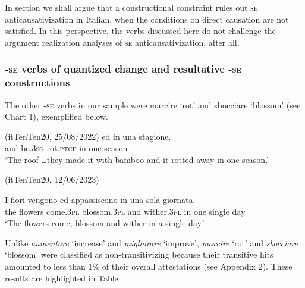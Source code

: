 \documentclass[output=paper,colorlinks,citecolor=brown
]{langscibook}
\begin{document}
In section  we shall argue that a constructional constraint rules out \textsc{se} anticausativization in Italian, when the conditions on direct causation are not satisfied. In this perspective, the verbs discussed here do not challenge the argument realization analyses of \textsc{se} anticausativization, after all.

\subsubsection{-\textsc{se} verbs of quantized change and resultative -\textsc{se} constructions}
\label{bentley_section_3.3.2}

The other -\textsc{se} verbs in our sample were marcire ‘rot’ and sbocciare ‘blossom’ (see Chart 1), exemplified below.

\hspace*{\fill}(itTenTen20, 25/08/2022)\quad
\ea \label{bentley_example_14}
    ed		 						in	una	stagione.  \\
 {} 				and	be.3\textsc{sg}	rot.\textsc{ptcp}		in	one	season \\
    \glt 			‘The roof  \ldots  they made it with bamboo and it rotted away in one season.’
\z



\hspace*{\fill}(itTenTen20, 12/06/2023)\quad

\ea \label{bentley_example_15}
    \gll I			fiori				vengono						ed		appassiscono	in 	una sola			giornata. \\
 the	flowers	come.3\textsc{pl}		blossom.3\textsc{pl}	and	wither.3\textsc{pl}				in		one	single	day \\
    \glt 				‘The flowers come, blossom and wither in a single day.’
\z

Unlike \textit{aumentare} ‘increase’ and \textit{migliorare} ‘improve’, \textit{marcire} ‘rot’ and \textit{sbocciare} ‘blossom’ were classified as non-transitivizing because their transitive hits amounted to less than 1\% of their overall attestations (see Appendix 2). These results are highlighted in Table .
\end{document}
